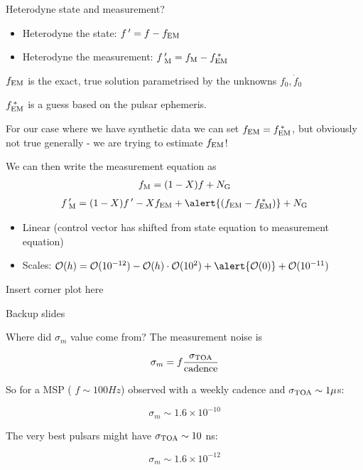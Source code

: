 \documentclass[10pt]{beamer}
\begin{document}
\begin{frame}{Heterodyne state and measurement?}
	
	\begin{itemize}
		\item Heterodyne the state: $f \, ' = f - f_{\rm EM}$ 
		\item Heterodyne the measurement: $f \, '_{\rm M}  = f_{\rm M} - f^{\, *}_{\rm EM}$ 
	\end{itemize}
	
	$f_{\rm EM}$ is the exact, true solution parametrised by the unknowns $f_0, \dot{f}_0$
	
	 $f^{\, *}_{\rm EM}$ is a guess based on the pulsar ephemeris. 
	 
	 For our case where we have synthetic data we can set $f_{\rm EM} = f^{\, *}_{\rm EM}$, but obviously not true generally - we are trying to estimate $f_{\rm EM}$!
	
	We can then write the measurement equation as
	\begin{eqnarray}
		f_{\rm M} = (1 - X)f + N_{\rm G} 
	\end{eqnarray}
\begin{eqnarray}
	f \, '_{\rm M} = (1 - X)f \, ' - X f_{\rm EM} + \alert{(f_{\rm EM} - f^{\, *}_{\rm EM})} +  N_{\rm G}
\end{eqnarray}
	
	\begin{itemize}
		\item Linear \checkmark (control vector has shifted from state equation to measurement equation)
		\item Scales: $\mathcal{O}(h) = \mathcal{O}(10^{-12}) - \mathcal{O}(h)\cdot\mathcal{O}(10^2) + \alert{\mathcal{O}(0)} + \mathcal{O}(10^{-11})$ \checkmark
	\end{itemize}
	
	
\end{frame}



\begin{frame}{}
	
Insert corner plot here
	
	
\end{frame}

\begin{frame}[standout]
	Backup slides
\end{frame}

\appendix


\begin{frame}[fragile]{Where did $\sigma_m$ value come from?}
The measurement noise is

$$ \sigma_m = f \frac{\sigma_{\rm TOA}}{\rm cadence}$$

So for a MSP ( $f \sim 100 Hz$) observed with a weekly cadence and $\sigma_{\rm TOA} \sim 1 \mu$s:


$$\sigma_m \sim 1.6 \times 10^{-10}$$

The very best pulsars might have $\sigma_{\rm TOA} \sim 10$ ns:

$$\sigma_m \sim 1.6 \times 10^{-12}$$
\end{frame}
\end{document}
